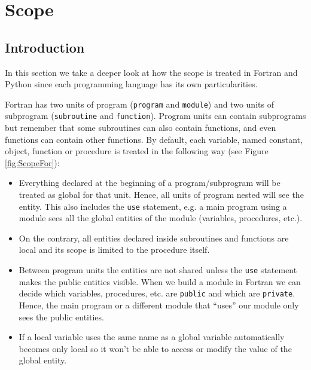 \chapter{Scope} 
 
    \section{Introduction}

In this section we take a deeper look at how the scope is treated in Fortran and Python since each programming language has its own particularities. 

Fortran has two units of program (\texttt{program} and \texttt{module}) and two units of subprogram (\texttt{subroutine} and \texttt{function}).
Program units can contain subprograms but remember that some subroutines can also contain functions, and even functions can contain other functions. 
By default, each variable, named constant, object, function or procedure is treated in the following way (see Figure \ref{fig:ScopeFor}):
\begin{itemize}
    \item Everything declared at the beginning of a program/subprogram will be treated as global for that unit. Hence, all units of program nested will see the entity.
    This also includes the \texttt{use} statement, e.g. a main program using a module sees all the global entities of the module (variables, procedures, etc.). 
    
    \item On the contrary, all entities declared inside subroutines and functions are local and its scope is limited to the procedure itself. 
    
    \item Between program units the entities are not shared unless the \texttt{use} statement makes the public entities visible. 
    When we build a module in Fortran we can decide which variables, procedures, etc. are \texttt{public} and which are \texttt{private}. Hence, the main program or a different module that ``uses'' our module only sees the public entities.
    
    \item If a local variable uses the same name as a global variable automatically becomes only local so it won't be able to access or modify the value of the global entity. 
\end{itemize}
 
